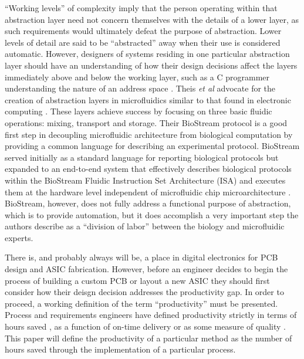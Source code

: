 ``Working levels'' of complexity imply that the person operating within that abstraction layer need not concern themselves with the details of a lower layer, as such requirements would ultimately defeat the purpose of abstraction. Lower levels of detail are said to be ``abstracted'' away when their use is considered automatic. However, designers of systems residing in one particular abstraction layer should have an understanding of how their design decisions affect the layers immediately above and below the working layer, such as a C programmer understanding the nature of an address space \cite{Harris+Harris}. Theis \emph{et al} advocate for the creation of abstraction layers in microfluidics similar to that found in electronic computing \cite{thies2008}. These layers achieve success by focusing on three basic fluidic operations: mixing, transport and storage. Their BioStream protocol is a good first step in decoupling microfluidic architecture from biological computation by providing a common language for describing an experimental protocol. BioStream served initially as a standard language for reporting biological protocols but expanded to an end-to-end system that effectively describes biological protocols within the BioStream Fluidic Instruction Set Architecture (ISA) and executes them at the hardware level independent of microfluidic chip microarchitecture \cite{thies2008}. BioStream, however, does not fully address a functional purpose of abstraction, which is to provide automation, but it does accomplish a very important step the authors describe as a ``division of labor'' between the biology and microfluidic experts. 

There is, and probably always will be, a place in digital electronics for PCB design and ASIC fabrication. However, before an engineer decides to begin the process of building a custom PCB or layout a new ASIC they should first consider how their deisgn decision addresses the productivity gap. In order to proceed, a working definition of the term ``productivity'' must be presented. Process and requirements engineers \cite{Review_ProcessEngr} have defined productivity strictly in terms of hours saved \cite{CostBenefit_hours}, as a function of on-time delivery \cite{OnTimeDelivery} or as some measure of quality \cite{Quality}. This paper will define the productivity of a particular method as the number of hours saved through the implementation of a particular process.

